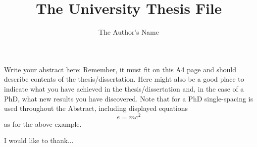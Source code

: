 \documentclass[12pt,MSc,twoside]{muthesis}
\numberwithin{equation}{chapter}															%
\begin{document}
\title{The University Thesis File}
\author{The Author's Name}
\def\wordcount{nnnnn}




\beforeabstract

Write your abstract here: Remember, it must fit on this A4 page and should
describe contents of the thesis/dissertation. Here might also be a good place
to indicate what you have achieved in the thesis/dissertation and, in the
case of a PhD, what new results you have discovered. Note that for a PhD
single-spacing is used throughout the Abstract, including displayed equations
\[
e = mc^{2}
\]
as for the above example.

\afterabstract

I would like to thank...

\afterpreface

\raggedright          																					%


 





\end{document}
